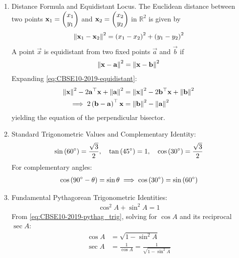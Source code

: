 \begin{enumerate}[label=\thesubsection.\arabic*, ref=\thesubsection.\theenumi]
	
	\item Distance Formula and Equidistant Locus.
	The Euclidean distance between two points $\mathbf{x}_1 = \begin{pmatrix}x_1 \\ y_1\end{pmatrix}$ and $\mathbf{x}_2 = \begin{pmatrix}x_2 \\ y_2\end{pmatrix}$ in $\mathbb{R}^2$ is given by
	\begin{align}
		\left\lVert\mathbf{x}_1 - \mathbf{x}_2\right\rVert^2 = \left(x_1 - x_2\right)^2 + \left(y_1 - y_2\right)^2 \label{eq:CBSE10-2019-dist_sq}
	\end{align}
	A point $\vec{x}$ is equidistant from two fixed points $\vec{a}$ and $\vec{b}$ if
	\begin{align}
		\left\lVert\mathbf{x} - \mathbf{a}\right\rVert^2 = \left\lVert\mathbf{x} - \mathbf{b}\right\rVert^2 \label{eq:CBSE10-2019-equidistant}
	\end{align}
	\solution
	Expanding \eqref{eq:CBSE10-2019-equidistant}:
	\begin{align}
		\left\lVert\mathbf{x}\right\rVert^2 - 2\mathbf{a}^\top \mathbf{x} + \left\lVert\mathbf{a}\right\rVert^2 &= \left\lVert\mathbf{x}\right\rVert^2 - 2\mathbf{b}^\top \mathbf{x} + \left\lVert\mathbf{b}\right\rVert^2 \\
		\implies 2\left(\mathbf{b} - \mathbf{a}\right)^\top \mathbf{x} &= \left\lVert\mathbf{b}\right\rVert^2 - \left\lVert\mathbf{a}\right\rVert^2 \label{eq:CBSE10-2019-perp_bisector}
	\end{align}
	yielding the equation of the perpendicular bisector.
	
	\item Standard Trigonometric Values and Complementary Identity:
	\begin{align}
		\sin\left(60^\circ\right) = \frac{\sqrt{3}}{2}, \quad \tan\left(45^\circ\right) = 1, \quad \cos\left(30^\circ\right) = \frac{\sqrt{3}}{2} \label{eq:CBSE10-2019-trig_values}
	\end{align}
	For complementary angles:
	\begin{align}
		\cos\left(90^\circ - \theta\right) = \sin\theta \implies \cos\left(30^\circ\right) = \sin\left(60^\circ\right) \label{eq:CBSE10-2019-trig_comp}
	\end{align}
	
	\item Fundamental Pythagorean Trigonometric Identities:
	\begin{align}
		\cos^2 A + \sin^2 A = 1 \label{eq:CBSE10-2019-pythag_trig}
	\end{align}
	\solution
	From \eqref{eq:CBSE10-2019-pythag_trig}, solving for $\cos A$ and its reciprocal $\sec A$:
	\begin{align}
		\cos A &= \sqrt{1 - \sin^2 A} \label{eq:CBSE10-2019-cos_from_sin} \\
		\sec A &= \frac{1}{\cos A} = \frac{1}{\sqrt{1 - \sin^2 A}} \label{eq:CBSE10-2019-sec_from_sin}
	\end{align}
	

\end{enumerate}
